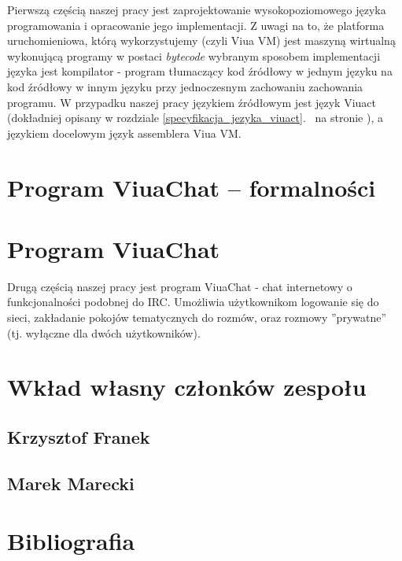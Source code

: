 \documentclass[11pt,oneside,a4paper,titlepage,onecolumn]{book}
\begin{document}
Pierwszą częścią naszej pracy jest zaprojektowanie wysokopoziomowego języka programowania i opracowanie jego
implementacji. Z uwagi na to, że platforma uruchomieniowa, którą wykorzystujemy (czyli Viua VM) jest maszyną
wirtualną wykonującą programy w postaci \emph{bytecode} wybranym sposobem implementacji języka jest
kompilator - program tłumaczący kod źródłowy w jednym języku na kod źródłowy w innym języku przy jednoczesnym
zachowaniu zachowania programu. W przypadku naszej pracy językiem źródłowym jest język Viuact (dokładniej
opisany w rozdziale \ref{specyfikacja_jezyka_viuact}.~ na stronie
\pageref{specyfikacja_jezyka_viuact}), a językiem docelowym język assemblera Viua VM.







\chapter{Program ViuaChat -- formalności}



\chapter{Program ViuaChat}
\label{program_viuachat}

Drugą częścią naszej pracy jest program ViuaChat - chat internetowy o funkcjonalności podobnej do IRC.
Umożliwia użytkownikom logowanie się do sieci, zakładanie pokojów tematycznych do rozmów, oraz rozmowy
''prywatne'' (tj. wyłączne dla dwóch użytkowników).





\chapter{Wkład własny członków zespołu}
\label{wklad_wlasny_czlonkow_zespolu}

\section{Krzysztof Franek}

\section{Marek Marecki}



\chapter{Bibliografia}
\end{document}
